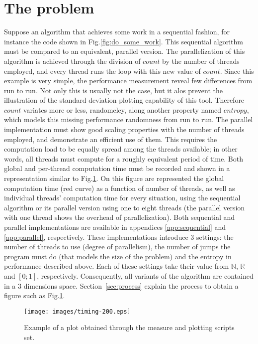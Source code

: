 \section{The problem}
\label{sec:problem}
Suppose an algorithm that achieves some work in a sequential fashion, for instance the code shown in Fig.\ref{fig:do_some_work}. This sequential algorithm must be compared to an equivalent, parallel version. The parallelization of this algorithm is achieved through the division of $count$ by the number of threads employed, and every thread runs the loop with this new value of $count$. Since this example is very simple, the performance measurement reveal few differences from run to run. Not only this is usually not the case, but it alos prevent the illustration of the standard deviation plotting capability of this tool. Therefore $count$ variates more or less, randomeley, along another property named $entropy$, which models this missing performance randomness from run to run. The parallel implementation must show good scaling properties with the number of threads employed, and demonstrate an efficient use of them. This requires the computation load to be equally spread among the threads available; in other words, all threads must compute for a roughly equivalent period of time. Both global and per-thread computation time must be recorded and shown in a representation similar to Fig.\ref{fig:timing-200}. On this figure are represented the global computation time (red curve) as a function of number of threads, as well as individual threads' computation time for every situation, using the sequential algorithm or its parallel version using one to eight threads (the parallel version with one thread shows the overhead of parallelization). Both sequential and parallel implementations are available in appendices \ref{app:sequential} and \ref{app:parallel}, respectively. These implementations introduce 3 settings: the number of threads to use (degree of parallelism), the number of jumps the program must do (that models the size of the problem) and the entropy in performance described above. Each of these settings take their value from $\mathbb{N}$, $\mathbb{R}$ and $\left[0;1\right]$, respectively. Consequently, all variants of the algorithm are contained in a 3 dimensions space. Section~\ref{sec:process} explain the process to obtain a figure such as Fig.\ref{fig:timing-200}.

\begin{figure}
\centering
\texttt{[image: images/timing-200.eps]}
\caption{Example of a plot obtained through the measure and plotting scripts set.}
\label{fig:timing-200}
\end{figure}

